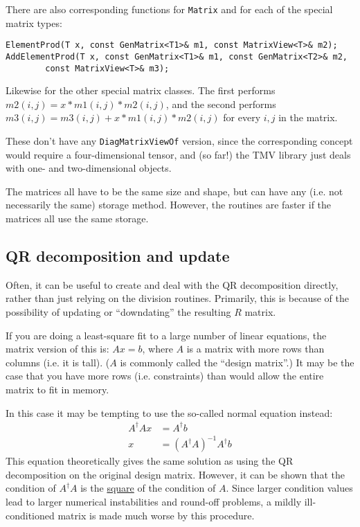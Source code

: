\documentclass[twoside,letterpaper,11pt]{article}
\renewcommand{\tt}[1]{{\texttt {#1}}}
\begin{document}
There are also corresponding functions for \tt{Matrix} and for each of the special
matrix types:
\begin{verbatim}
ElementProd(T x, const GenMatrix<T1>& m1, const MatrixView<T>& m2);
AddElementProd(T x, const GenMatrix<T1>& m1, const GenMatrix<T2>& m2,
        const MatrixView<T>& m3);
\end{verbatim}
Likewise for the other special matrix classes.  The first performs 
$m2(i,j) = x * m1(i,j) * m2(i,j)$, and the second performs
$m3(i,j) = m3(i,j) + x * m1(i,j) * m2(i,j)$ for every $i,j$ in the matrix.

These don't have any \tt{DiagMatrixViewOf} version, since the corresponding 
concept would require a four-dimensional tensor, and (so far!) the TMV library
just deals with one- and two-dimensional objects.

The matrices all have to be the same size and shape, but can have any 
(i.e. not necessarily the same) storage method.  However, the routines are faster
if the matrices all use the same storage.

\subsection{QR decomposition and update}

Often, it can be useful to create and deal with the QR decomposition directly,
rather than 
just relying on the division routines.  Primarily, this is because of the possibility
of updating or ``downdating'' the resulting $R$ matrix.  

If you are doing a 
least-square fit to a large number of linear equations, the matrix version of this
is: $A x = b$, where $A$ is a matrix with more rows than columns (i.e. it is tall).
($A$ is commonly called the ``design matrix''.)
It may be the case that you
have more rows (i.e. constraints) than would allow the entire matrix to fit in memory.  

In this case it may be tempting to use the so-called normal equation instead: 
\begin{align*}
A^\dagger A x &= A^\dagger b \\
x & = (A^\dagger A)^{-1} A^\dagger b
\end{align*}
This equation theoretically gives the same 
solution as using the QR decomposition on the original design matrix.
However, it can be shown that the condition of $A^\dagger A$ is the 
\underline{square} of the condition of $A$.  Since larger condition values
lead to larger numerical instabilities and round-off problems, a mildly
ill-conditioned matrix is made much worse by this procedure.
\end{document}
